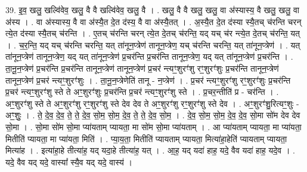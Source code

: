 \documentclass[17pt]{extarticle}
\begin{document}
39. इ॒व॒ खलु॒ खल्वि॑वेव॒ खलु॒ वै वै खल्वि॑वेव॒ खलु॒ वै । . खलु॒ वै वै खलु॒ खलु॒ वा अ॑स्यास्य॒ वै खलु॒ खलु॒ वा अ॑स्य । . वा अ॑स्यास्य॒ वै वा अ॑स्यै॒त दे॒त द॑स्य॒ वै वा अ॑स्यै॒तत् । . अ॒स्यै॒त दे॒त द॑स्या स्यै॒तच् च॑रन्ति चरन् त्ये॒त द॑स्या स्यै॒तच् च॑रन्ति । . ए॒तच् च॑रन्ति चरन् त्ये॒त दे॒तच् च॑रन्ति॒ यद् यच् च॑र न्त्ये॒त दे॒तच् च॑रन्ति॒ यत् । . च॒र॒न्ति॒ यद् यच् च॑रन्ति चरन्ति॒ यत् ता॑नून॒प्त्रेण॑ तानून॒प्त्रेण॒ यच् च॑रन्ति चरन्ति॒ यत् ता॑नून॒प्त्रेण॑ । . यत् ता॑नून॒प्त्रेण॑ तानून॒प्त्रेण॒ यद् यत् ता॑नून॒प्त्रेण॑ प्र॒चर॑न्ति प्र॒चर॑न्ति तानून॒प्त्रेण॒ यद् यत् ता॑नून॒प्त्रेण॑ प्र॒चर॑न्ति । . ता॒नू॒न॒प्त्रेण॑ प्र॒चर॑न्ति प्र॒चर॑न्ति तानून॒प्त्रेण॑ तानून॒प्त्रेण॑ प्र॒चर॑ न्त्यꣳ॒॒शुरꣳ॑शु
रꣳ॒॒शुरꣳ॑शुः प्र॒चर॑न्ति तानून॒प्त्रेण॑ तानून॒प्त्रेण॑ प्र॒चर॑ न्त्यꣳ॒॒शुरꣳ॑शुः । . ता॒नू॒न॒प्त्रेणेति॑ तानू - न॒प्त्रेण॑ । . प्र॒चर॑ न्त्यꣳ॒॒शुरꣳ॑शु रꣳ॒॒शुरꣳ॑शुः प्र॒चर॑न्ति प्र॒चर॑ न्त्यꣳ॒॒शुरꣳ॑शु स्ते ते 
अꣳ॒॒शुरꣳ॑शुः प्र॒चर॑न्ति प्र॒चर॑ न्त्यꣳ॒॒शुरꣳ॑शु स्ते । . प्र॒चर॒न्तीति॑ प्र - चर॑न्ति । . अꣳ॒॒शुरꣳ॑शु स्ते ते अꣳ॒॒शुरꣳ॑शु रꣳ॒॒शुरꣳ॑शु स्ते देव देव ते अꣳ॒॒शुरꣳ॑शु 
रꣳ॒॒शुरꣳ॑शु स्ते देव । . अꣳ॒॒शुरꣳ॑शु॒रित्यꣳ॒॒शुः - अꣳ॒॒शुः॒ । . ते॒ दे॒व॒ दे॒व॒ ते॒ ते॒ दे॒व॒ सो॒म॒ सो॒म॒ दे॒व॒ ते॒ ते॒ दे॒व॒ सो॒म॒ । . दे॒व॒ सो॒म॒ सो॒म॒ दे॒व॒ दे॒व॒ सो॒मा सो॑म देव देव सो॒मा । . सो॒मा सो॑म सो॒मा प्या॑यताम् प्यायता॒ मा सो॑म सो॒मा प्या॑यताम् । . आ प्या॑यताम् प्यायता॒ मा प्या॑यता॒ मितीति॑ प्यायता॒ मा प्या॑यता॒ मिति॑ । . प्या॒य॒ता॒ मितीति॑ प्यायताम् प्यायता॒ मित्या॑हा॒हेति॑ प्यायताम् प्यायता॒ मित्या॑ह । . इत्या॑हा॒हे तीत्या॑ह॒ यद् यदा॒हे तीत्या॑ह॒ यत् । . आ॒ह॒ यद् यदा॑ हाह॒ यदे॒ वैव यदा॑ हाह॒ यदे॒व । . यदे॒ वैव यद् यदे॒ वास्या᳚ स्यै॒व यद् यदे॒ वास्य॑ । \newline
\pagebreak
{}
\end{document}
